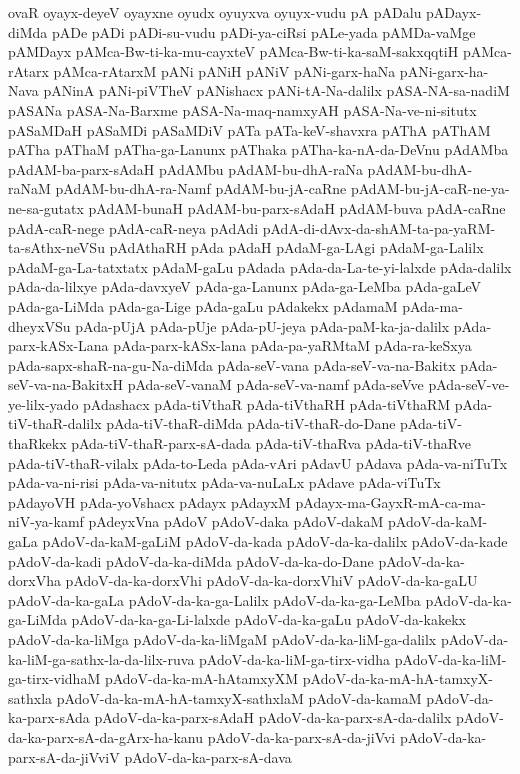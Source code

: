 {ovaR
oyayx-deyeV
oyayxne
oyudx
oyuyxva
oyuyx-vudu
pA
pADalu
pADayx-diMda
pADe
pADi
pADi-su-vudu
pADi-ya-ciRsi
pALe-yada
pAMDa-vaMge
pAMDayx
pAMca-Bw-ti-ka-mu-cayxteV
pAMca-Bw-ti-ka-saM-sakxqqtiH
pAMca-rAtarx
pAMca-rAtarxM
pANi
pANiH
pANiV
pANi-garx-haNa
pANi-garx-ha-Nava
pANinA
pANi-piVTheV
pANishacx
pANi-tA-Na-dalilx
pASA-NA-sa-nadiM
pASANa
pASA-Na-Barxme
pASA-Na-maq-namxyAH
pASA-Na-ve-ni-situtx
pASaMDaH
pASaMDi
pASaMDiV
pATa
pATa-keV-shavxra
pAThA
pAThAM
pATha
pAThaM
pATha-ga-Lanunx
pAThaka
pATha-ka-nA-da-DeVnu
pAdAMba
pAdAM-ba-parx-sAdaH
pAdAMbu
pAdAM-bu-dhA-raNa
pAdAM-bu-dhA-raNaM
pAdAM-bu-dhA-ra-Namf
pAdAM-bu-jA-caRne
pAdAM-bu-jA-caR-ne-ya-ne-sa-gutatx
pAdAM-bunaH
pAdAM-bu-parx-sAdaH
pAdAM-buva
pAdA-caRne
pAdA-caR-nege
pAdA-caR-neya
pAdAdi
pAdA-di-dAvx-da-shAM-ta-pa-yaRM-ta-sAthx-neVSu
pAdAthaRH
pAda
pAdaH
pAdaM-ga-LAgi
pAdaM-ga-Lalilx
pAdaM-ga-La-tatxtatx
pAdaM-gaLu
pAdada
pAda-da-La-te-yi-lalxde
pAda-dalilx
pAda-da-lilxye
pAda-davxyeV
pAda-ga-Lanunx
pAda-ga-LeMba
pAda-gaLeV
pAda-ga-LiMda
pAda-ga-Lige
pAda-gaLu
pAdakekx
pAdamaM
pAda-ma-dheyxVSu
pAda-pUjA
pAda-pUje
pAda-pU-jeya
pAda-paM-ka-ja-dalilx
pAda-parx-kASx-Lana
pAda-parx-kASx-lana
pAda-pa-yaRMtaM
pAda-ra-keSxya
pAda-sapx-shaR-na-gu-Na-diMda
pAda-seV-vana
pAda-seV-va-na-Bakitx
pAda-seV-va-na-BakitxH
pAda-seV-vanaM
pAda-seV-va-namf
pAda-seVve
pAda-seV-ve-ye-lilx-yado
pAdashacx
pAda-tiVthaR
pAda-tiVthaRH
pAda-tiVthaRM
pAda-tiV-thaR-dalilx
pAda-tiV-thaR-diMda
pAda-tiV-thaR-do-Dane
pAda-tiV-thaRkekx
pAda-tiV-thaR-parx-sA-dada
pAda-tiV-thaRva
pAda-tiV-thaRve
pAda-tiV-thaR-vilalx
pAda-to-Leda
pAda-vAri
pAdavU
pAdava
pAda-va-niTuTx
pAda-va-ni-risi
pAda-va-nitutx
pAda-va-nuLaLx
pAdave
pAda-viTuTx
pAdayoVH
pAda-yoVshacx
pAdayx
pAdayxM
pAdayx-ma-GayxR-mA-ca-ma-niV-ya-kamf
pAdeyxVna
pAdoV
pAdoV-daka
pAdoV-dakaM
pAdoV-da-kaM-gaLa
pAdoV-da-kaM-gaLiM
pAdoV-da-kada
pAdoV-da-ka-dalilx
pAdoV-da-kade
pAdoV-da-kadi
pAdoV-da-ka-diMda
pAdoV-da-ka-do-Dane
pAdoV-da-ka-dorxVha
pAdoV-da-ka-dorxVhi
pAdoV-da-ka-dorxVhiV
pAdoV-da-ka-gaLU
pAdoV-da-ka-gaLa
pAdoV-da-ka-ga-Lalilx
pAdoV-da-ka-ga-LeMba
pAdoV-da-ka-ga-LiMda
pAdoV-da-ka-ga-Li-lalxde
pAdoV-da-ka-gaLu
pAdoV-da-kakekx
pAdoV-da-ka-liMga
pAdoV-da-ka-liMgaM
pAdoV-da-ka-liM-ga-dalilx
pAdoV-da-ka-liM-ga-sathx-la-da-lilx-ruva
pAdoV-da-ka-liM-ga-tirx-vidha
pAdoV-da-ka-liM-ga-tirx-vidhaM
pAdoV-da-ka-mA-hAtamxyXM
pAdoV-da-ka-mA-hA-tamxyX-sathxla
pAdoV-da-ka-mA-hA-tamxyX-sathxlaM
pAdoV-da-kamaM
pAdoV-da-ka-parx-sAda
pAdoV-da-ka-parx-sAdaH
pAdoV-da-ka-parx-sA-da-dalilx
pAdoV-da-ka-parx-sA-da-gArx-ha-kanu
pAdoV-da-ka-parx-sA-da-jiVvi
pAdoV-da-ka-parx-sA-da-jiVviV
pAdoV-da-ka-parx-sA-dava
}
